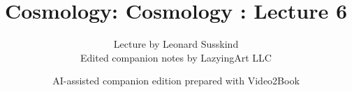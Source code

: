 \documentclass[11pt,oneside]{book}
\begin{document}
\frontmatter
\title{Cosmology: Cosmology : Lecture 6}
\author{Lecture by Leonard Susskind\\Edited companion notes by LazyingArt LLC}
\date{AI-assisted companion edition prepared with Video2Book}
\maketitle
\clearpage
\mainmatter

\end{document}
